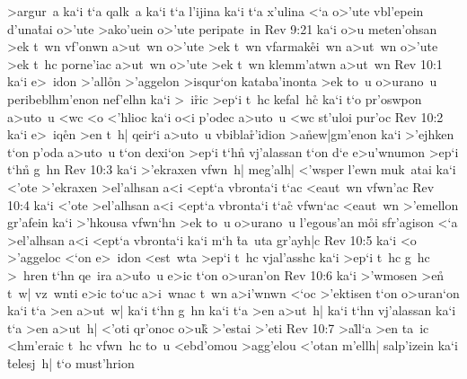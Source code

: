 >argur~a
ka`i
t`a
qalk~a
ka`i
t`a
l'ijina
ka`i
t`a
x'ulina
<`a
o>'ute
vbl'epein
d'una\r{t}ai
o>'ute
>ako'uein
o>'ute
peripate~in\bibvsend
\vs Rev 9:21
ka`i
o>u
meten'ohsan
>ek
t~wn
vf'onwn
a>ut~wn
o>'ute
>ek
t~wn
vfarmak\r{e}i~wn
a>ut~wn
o>'ute
>ek
t~hc
porne'iac
a>ut~wn
o>'ute
>ek
t~wn
klemm'atwn
a>ut~wn\bibvsend
\vs Rev 10:1
ka`i
e>~idon
>'all\r{o}n
>'aggelon
>isqur`on
kataba'inonta
>ek
to~u
o>urano~u
peribeblhm'enon
nef'elhn
ka`i
>~i\r{r}ic
>ep`i
t~hc
kefal~h\r{c}
ka`i
t`o
pr'oswpon
a>uto~u
<wc
<o
<'hlioc
ka`i
o<i
p'odec
a>uto~u
<wc
st'uloi
pur'oc\bibvsend
\vs Rev 10:2
ka`i
e>~iq\r{e}n
>en
t~h|
qeir`i
a>uto~u
vbibla\r{r}'idion
>a\r{n}ew|gm'enon
ka`i
>'ejhken
t`on
p'oda
a>uto~u
t`on
dexi`on
>ep`i
t`hn\r{}
vj'alassan
t`on
d`e
e>u'wnumon
>ep`i
t`hn\r{}
g~hn\bibvsend
\vs Rev 10:3
ka`i
>'ekraxen
vfwn~h|
meg'alh|
<'wsper
l'ewn
muk~atai
ka`i
<'ote
>'ekraxen
>el'alhsan
a<i
<ept`a
vbronta`i
t`ac
<eaut~wn
vfwn'ac\bibvsend
\vs Rev 10:4
ka`i
<'ote
>el'alhsan
a<i
<ept`a
vbronta`i
t`ac\r{}
vfwn`ac
<eaut~wn
>'emellon
gr'afein
ka`i
>'hkousa
vfwn`hn
>ek
to~u
o>urano~u
l'egous'an
m\r{o}i
sfr'agison
<`a
>el'alhsan
a<i
<ept`a
vbronta`i
ka`i
m`h
\r{t}a~uta
gr'ayh|c\bibvsend
\vs Rev 10:5
ka`i
<o
>'aggeloc
<`on
e>~idon
<est~wta
>ep`i
t~hc
vjal'asshc
ka`i
>ep`i
t~hc
g~hc
>~hren
t`hn
qe~ira
a>u\r{t}o~u
e>ic
t`on
o>uran'on\bibvsend
\vs Rev 10:6
ka`i
>'wmosen
>e\r{n}
t~w|
vz~wnti
e>ic
to`uc
a>i~wnac
t~wn
a>i'wnwn
<`oc
>'ektisen
t`on
o>uran`on
ka`i
t`a
>en
a>ut~w|
ka`i
t`hn
g~hn
ka`i
t`a
>en
a>ut~h|
ka`i
t`hn
vj'alassan
ka`i
t`a
>en
a>ut~h|
<'oti
qr'onoc
o>uk\r{}
>'estai
>'eti\bibvsend
\vs Rev 10:7
>a\r{l}l`a
>en
ta~ic
<hm'eraic
t~hc
vfwn~hc
to~u
<ebd'omou
>agg'elou
<'otan
m'ellh|
salp'izein
ka`i
\r{t}elesj~h|
t`o
must'hrion
